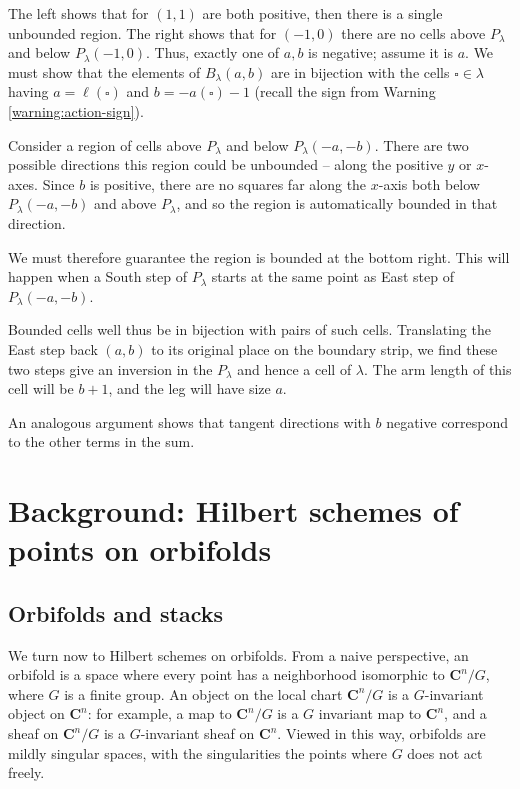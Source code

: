 \documentclass{amsart}[12pt]
\theoremstyle{definition}
\newcommand{\C}{\mathbf{C}}
\begin{document}
The left shows that for $(1,1)$ are both positive, then there is a single unbounded region.  The right shows that for $(-1,0)$ there are no cells above $P_\lambda$ and below $P_\lambda(-1,0)$.
Thus, exactly one of $a,b$ is negative; assume it is $a$.  We must show that the elements of $B_\lambda(a,b)$ are in bijection with the cells $\square\in\lambda$ having  $a=\ell(\square)$ and $b=-a(\square)-1$ (recall the sign from Warning \ref{warning:action-sign}).

Consider a region of cells above $P_\lambda$ and below $P_\lambda(-a,-b)$.  There are two possible directions this region could be unbounded -- along the positive $y$ or $x$-axes.  Since $b$ is positive, there are no squares far along the $x$-axis both below $P_\lambda(-a,-b)$  and above $P_\lambda$, and so the region is automatically bounded in that direction.  

We must therefore guarantee the region is bounded at the bottom right.  This will happen when a South step of $P_\lambda$ starts at the same point as East step of $P_\lambda(-a,-b)$.  




Bounded cells well thus be in bijection with pairs of such cells.  Translating the East step back $(a,b)$ to its original place on the boundary strip, we find these two steps give an inversion in the $P_\lambda$ and hence a cell of $\lambda$.  The arm length of this cell will be $b+1$, and the leg will have size $a$. 

An analogous argument shows that tangent directions with $b$ negative correspond to the other terms in the sum.




\section{Background: Hilbert schemes of points on orbifolds}


\subsection{Orbifolds and stacks}
We turn now to Hilbert schemes on orbifolds.  From a naive perspective, an orbifold is a space where every point has a neighborhood isomorphic to $\C^n/G$, where $G$ is a finite group.  An object on the local chart $\C^n/G$ is a $G$-invariant object on $\C^n$: for example, a map to $\C^n/G$ is a $G$ invariant map to $\C^n$, and a sheaf on $\C^n/G$ is a $G$-invariant sheaf on $\C^n$.  Viewed in this way, orbifolds are mildly singular spaces, with the singularities the points where $G$ does not act freely.
\end{document}
